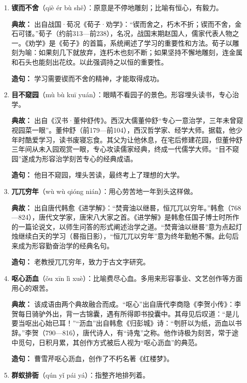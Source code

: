 \begin{enumerate}[leftmargin=*]
    \item \textbf{锲而不舍}（qiè ér bù shě）：原意是不停地雕刻；比喻有恒心，有毅力。
    
    \textbf{典故：} 出自战国·荀况《荀子·劝学》：“锲而舍之，朽木不折；锲而不舍，金石可镂。”荀子（约前313—前238），名况，战国末期赵国人，儒家代表人物之一。《劝学》是《荀子》的首篇，系统阐述了学习的重要性和方法。荀子以雕刻为喻：如果刻几下就放弃，连朽木也刻不断；如果坚持不懈地雕刻，连金属和石头也能刻出花纹。以此强调持之以恒的重要性。
    
    \textbf{造句：} 学习需要锲而不舍的精神，才能取得成功。

    \item \textbf{目不窥园}（mù bù kuī yuán）：眼睛不看园子的景色。形容埋头读书，专心治学。
    
    \textbf{典故：} 出自《汉书·董仲舒传》。西汉大儒董仲舒“专心一意治学，三年未曾窥视园菜一眼”。董仲舒（前179—前104），西汉哲学家、经学大师。据载，他少年时酷爱学习，读书废寝忘食。其父为让他休息，在宅后修建花园，但董仲舒三年间从未入园观赏一眼，专心攻读儒家经典，终成一代儒学大师。“目不窥园”遂成为形容治学刻苦专心的经典成语。
    
    \textbf{造句：} 他目不窥园，埋头苦读，最终考上了理想的大学。

    \item \textbf{兀兀穷年}（wù wù qióng nián）：用心劳苦地一年到头这样做。
    
    \textbf{典故：} 出自唐代韩愈《进学解》：“焚膏油以继晷，恒兀兀以穷年。”韩愈（768—824），唐代文学家，唐宋八大家之首。《进学解》是韩愈任国子博士时所作的一篇论说文，以师生问答的形式阐述治学之道。“焚膏油以继晷”意为点起灯烛继续白天的学习（晷指日影），“恒兀兀以穷年”意为终年勤勉不懈。此句后来成为形容勤奋治学的经典名句。
    
    \textbf{造句：} 老教授兀兀穷年，致力于古文字研究。

    \item \textbf{呕心沥血}（ǒu xīn lì xuè）：比喻费尽心血。多用来形容事业、文艺创作等方面用心的艰苦。
    
    \textbf{典故：} 该成语由两个典故融合而成。“呕心”出自唐代李商隐《李贺小传》：李贺每日骑驴外出，背一古锦囊，遇有所得即书投囊中。其母见后叹道：“是儿要当呕出心始已耳！”“沥血”出自韩愈《归彭城》诗：“刳肝以为纸，沥血以书辞。”李贺（790—816），唐代诗人，有“诗鬼”之称。他作诗极为刻苦，常于途中觅句，日积月累，其创作方式被后人视为“呕心沥血”的典范。
    
    \textbf{造句：} 曹雪芹呕心沥血，创作了不朽名著《红楼梦》。

    \item \textbf{群蚁排衙}（qún yǐ pái yá）：指整齐地排列着。
    

\end{enumerate}
